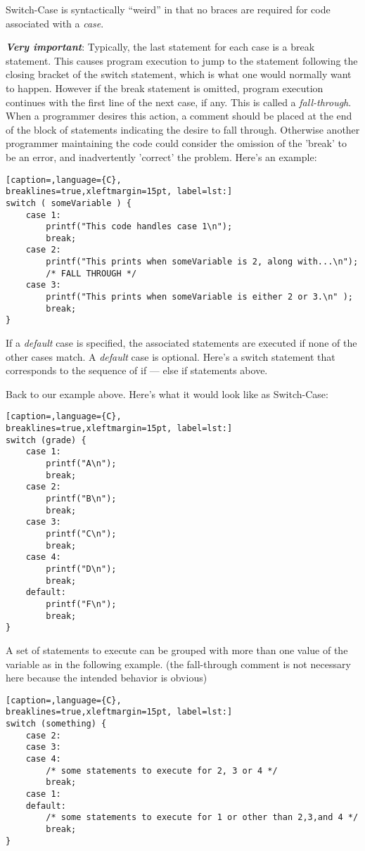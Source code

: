 Switch-Case is syntactically ``weird'' in that no braces are required for code
associated with a \emph{case}.

\textbf{\emph{Very important}}: Typically, the last statement for each case is
a break statement. This causes program execution to jump to the statement
following the closing bracket of the switch statement, which is what one would
normally want to happen. However if the break statement is omitted, program
execution continues with the first line of the next case, if any. This is
called a \emph{fall-through}. When a programmer desires this action, a comment
should be placed at the end of the block of statements indicating the desire to
fall through. Otherwise another programmer maintaining the code could consider
the omission of the 'break' to be an error, and inadvertently 'correct' the
problem. Here's an example:
\lstset{basicstyle=\scriptsize, numbers=left, captionpos=b, tabsize=4}
\begin{lstlisting}[caption=,language={C},
breaklines=true,xleftmargin=15pt, label=lst:]
switch ( someVariable ) {
	case 1:
		printf("This code handles case 1\n");
		break;
	case 2:
		printf("This prints when someVariable is 2, along with...\n");
		/* FALL THROUGH */
	case 3:
		printf("This prints when someVariable is either 2 or 3.\n" );
		break;
}
\end{lstlisting}

If a \emph{default} case is specified, the associated statements are executed
if none of the other cases match. A \emph{default} case is optional. Here's a
switch statement that corresponds to the sequence of if --- else if statements
above.

Back to our example above. Here's what it would look like as Switch-Case:
\lstset{basicstyle=\scriptsize, numbers=left, captionpos=b, tabsize=4}
\begin{lstlisting}[caption=,language={C},
breaklines=true,xleftmargin=15pt, label=lst:]
switch (grade) {
	case 1:
		printf("A\n");
		break;
	case 2:
		printf("B\n");
		break;
	case 3:
		printf("C\n");
		break;
	case 4:
		printf("D\n");
		break;
	default:
		printf("F\n");
		break;
}
\end{lstlisting}

A set of statements to execute can be grouped with more than one value of the
variable as in the following example. (the fall-through comment is not
necessary here because the intended behavior is obvious)

\lstset{basicstyle=\scriptsize, numbers=left, captionpos=b, tabsize=4}
\begin{lstlisting}[caption=,language={C},
breaklines=true,xleftmargin=15pt, label=lst:]
switch (something) {
	case 2:
	case 3:
	case 4:
		/* some statements to execute for 2, 3 or 4 */
		break;
	case 1:
	default:
		/* some statements to execute for 1 or other than 2,3,and 4 */
		break;
}
\end{lstlisting}

